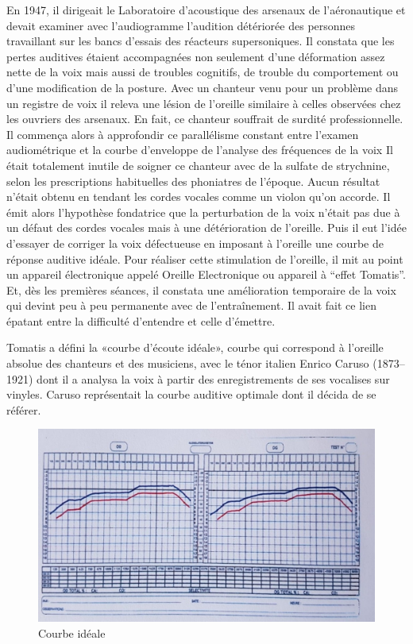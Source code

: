 En 1947, il dirigeait le Laboratoire d'acoustique
des arsenaux de l'aéronautique et devait examiner avec l'audiogramme l'audition détériorée
des personnes travaillant sur les bancs d'essais des réacteurs supersoniques. Il constata que les pertes auditives étaient accompagnées non seulement  d'une
déformation assez nette de la voix mais aussi de troubles cognitifs, de trouble du comportement ou d'une modification de la posture. Avec
un chanteur venu pour un problème dans un registre de voix il releva une lésion de l'oreille similaire
à celles observées chez les ouvriers des arsenaux. En fait, ce chanteur
souffrait de surdité professionnelle. Il commença alors à approfondir
ce parallélisme constant entre l'examen audiométrique et la courbe
d'enveloppe de l'analyse des fréquences de la voix Il était totalement
inutile de soigner ce chanteur avec de la sulfate de
strychnine, selon les prescriptions habituelles des phoniatres de
l'époque. Aucun résultat n'était obtenu en tendant les cordes vocales
comme un violon qu'on accorde. Il émit alors l'hypothèse fondatrice
que la perturbation de la voix n'était pas due à un défaut des cordes
vocales mais à une détérioration de l'oreille. Puis il eut l'idée
d'essayer de corriger la voix défectueuse en imposant à l'oreille
une courbe de réponse auditive idéale. Pour réaliser cette stimulation
de l'oreille, il mit au point un appareil électronique appelé Oreille
Electronique ou appareil à ``effet Tomatis''. Et, dès les premières
séances, il constata une amélioration temporaire de la voix qui devint
peu à peu permanente avec de l'entraînement. Il avait fait ce lien épatant entre la difficulté d'entendre et celle d'émettre.

Tomatis a défini la «courbe d'écoute idéale», courbe qui correspond à l'oreille absolue
des chanteurs et des musiciens,  avec  le ténor italien Enrico
Caruso (1873--1921) dont il a analysa la voix à partir des enregistrements
de ses vocalises sur vinyles. Caruso représentait la courbe auditive
optimale dont il décida de se référer. 

\begin{figure}
	\centering
	\includegraphics[width=0.7\linewidth]{images/courbeideale.jpg}
	\caption{Courbe idéale}
	\label{fig:courbeideale}
\end{figure}



